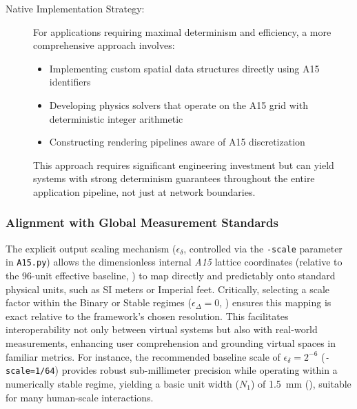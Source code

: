 \documentclass[10pt]{article}
\def\AAAB{\textit{A15}}
\begin{document}
\begin{description}
    \item[Native Implementation Strategy:] For applications requiring maximal determinism and efficiency, a more comprehensive approach involves:
        \begin{itemize} \itemsep0pt
            \item Implementing custom spatial data structures directly using A15 identifiers
            \item Developing physics solvers that operate on the A15 grid with deterministic integer arithmetic
            \item Constructing rendering pipelines aware of A15 discretization
        \end{itemize}
        This approach requires significant engineering investment but can yield systems with strong determinism guarantees throughout the entire application pipeline, not just at network boundaries.
\end{description}

\subsubsection{Alignment with Global Measurement Standards}\label{subsubsec-apps-measurement}
The explicit output scaling mechanism ($\epsilon_\delta$, controlled via the \texttt{-scale} parameter in \texttt{A15.py}) allows the dimensionless internal \AAAB{} lattice coordinates (relative to the 96-unit effective baseline, ) to map directly and predictably onto standard physical units, such as SI meters or Imperial feet. Critically, selecting a scale factor within the Binary or Stable regimes ($\epsilon_\Delta=0$, ) ensures this mapping is exact relative to the framework's chosen resolution. This facilitates interoperability not only between virtual systems but also with real-world measurements, enhancing user comprehension and grounding virtual spaces in familiar metrics. For instance, the recommended baseline scale of $\epsilon_\delta = 2^{-6}$ (\texttt{-scale=1/64}) provides robust sub-millimeter precision while operating within a numerically stable regime, yielding a basic unit width ($N_1$) of \SI{1.5}{\milli\meter} (), suitable for many human-scale interactions.
\end{document}

